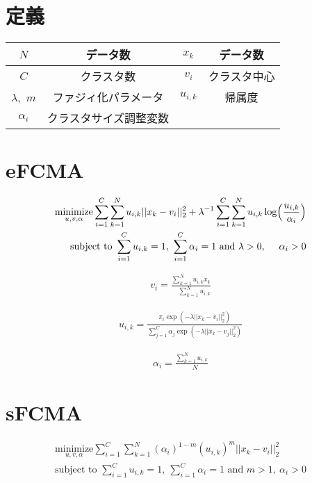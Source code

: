 \documentclass[a4j,12pt,dvipdfmx,oneside]{jsbook}
\theoremstyle{definition}
\begin{document}
\section{定義}\label{sec:suggest_method_define}
%
  \begin{center}
   \begin{tabular}{c|c||c|c} \hline
     {$N$}&データ数&{$x_k$}&データ数 \\ \hline
     {$C$}&クラスタ数&{$v_i$}&クラスタ中心\\ \hline
     {$\lambda$,~$m$}&ファジィ化パラメータ&{$u_{i,k}$}&帰属度 \\ \hline
     {$\alpha_i$}&クラスタサイズ調整変数\\ \hline
   \end{tabular}
  \end{center}

\section{eFCMA}\label{sec:efcma}
%
\begin{align}
 \underset{u,v,\alpha}{\text{minimize}}
    \sum_{i=1}^C\sum_{k=1}^Nu_{i,k}||x_k-v_i||_2^2+\lambda^{-1}\sum_{i=1}^C\sum_{k=1}^Nu_{i,k}\log\Bigl(\frac{u_{i,k}}{\alpha_{i}}\Bigl)\\
    {\text{subject to }}\sum_{i=1}^Cu_{i,k}=1,~\sum_{i=1}^C\alpha_{i}=1{\text{ and }}\lambda>0,~\quad\alpha_{i}>0
\end{align}

\begin{align}
    v_{i}=\frac{\sum_{k=1}^Nu_{i,k}x_{k}}{\quad\sum_{k=1}^Nu_{i,k}}
\end{align}

\begin{align}
    u_{i,k}=\frac{\pi_{i}\exp(-\lambda||x_k-v_i||_2^2)}{\sum_{j=1}^C\alpha_{j}\exp(-\lambda||x_k-v_j||_2^2)}
\end{align}

\begin{align}
    \alpha_{i}=\frac{\sum_{k=1}^Nu_{i,k}}{\quad N}
\end{align}

\section{sFCMA}\label{sec:sfcma}
%
\begin{align}
 \underset{u,v,\alpha}{\text{minimize}}
 \sum_{i=1}^C\sum_{k=1}^N(\alpha_{i})^{1-m}(u_{i,k})^m||x_k-v_i||_2^2\\
 {\text{subject to }}\sum_{i=1}^Cu_{i,k}=1,~\sum_{i=1}^C\alpha_{i}=1{\text{ and }}m>1,~\alpha_{i}>0
\end{align}
 
\end{document}

